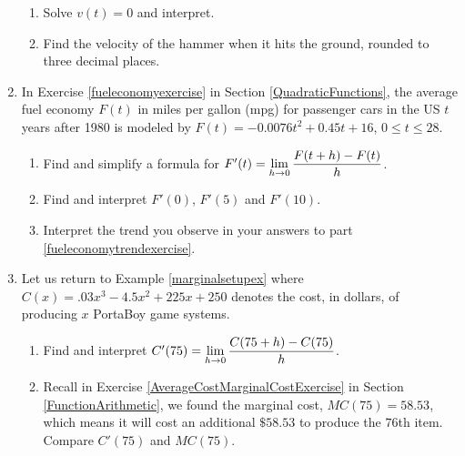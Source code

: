 \documentclass{ximera}
\begin{document}
\begin{enumerate}
\begin{enumerate}
\item  Solve $v(t) = 0$ and interpret.

\item  Find the velocity of the hammer when it hits the ground, rounded to three decimal places.

\end{enumerate}

\item  In Exercise \ref{fueleconomyexercise}  in Section \ref{QuadraticFunctions}, the average fuel economy $F(t)$ in miles per gallon (mpg) for passenger cars in the US $t$ years after 1980 is modeled by  $F(t) = -0.0076t^2+0.45t + 16$, $0 \leq t \leq 28$. 

\begin{enumerate}

\item  Find and simplify a formula for  $F'(t) = \ds{\lim_{h \rightarrow 0} \dfrac{F(t + h) - F(t)}{h}}$.

\item\label{fueleconomytrendexercise}  Find and interpret $F'(0)$, $F'(5)$ and $F'(10)$.

\item  Interpret the trend you observe in your answers to part \ref{fueleconomytrendexercise}.

\end{enumerate}

\item\label{MarginalCostDerivativeExercise} Let us return to Example \ref{marginalsetupex} where  $C(x) = .03x^{3} - 4.5x^{2} + 225x + 250$ denotes the cost, in dollars,  of producing $x$ PortaBoy game systems.

\begin{enumerate}

\item  Find and interpret $C'(75) = \ds{\lim_{h \rightarrow 0} \dfrac{C(75+h) - C(75)}{h}}$.

\item  Recall in Exercise \ref{AverageCostMarginalCostExercise} in Section \ref{FunctionArithmetic}, we found the marginal cost, $MC(75) = 58.53$,   which means it will cost an additional $\$ 58.53$ to produce the $76$th item.  Compare $C'(75)$ and $MC(75)$. 

\end{enumerate}

\setcounter{HW}{\value{enumi}}
\end{enumerate}

\newpage
\end{document}
